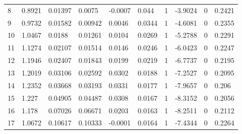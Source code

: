 \begin{singlespace}
\begin{table}[H]
\begin{tabular}{|l|l|l|l|l|l|l|l|l|l|}
8     & 0.8921  & 0.01397 & 0.0075  & -0.0007 & 0.044   & 1       & -3.9024 & 0      & 0.2421 \\
9     & 0.9732  & 0.01582 & 0.00942 & 0.0046  & 0.0344  & 1       & -4.6081 & 0      & 0.2355 \\
10    & 1.0467  & 0.0188  & 0.01261 & 0.0104  & 0.0269  & 1       & -5.2788 & 0      & 0.2291 \\
11    & 1.1274  & 0.02107 & 0.01514 & 0.0146  & 0.0246  & 1       & -6.0423 & 0      & 0.2247 \\
12    & 1.1946  & 0.02407 & 0.01843 & 0.0199  & 0.0219  & 1       & -6.7737 & 0      & 0.2195 \\
13    & 1.2019  & 0.03106 & 0.02592 & 0.0302  & 0.0188  & 1       & -7.2527 & 0      & 0.2095 \\
14    & 1.2352  & 0.03668 & 0.03193 & 0.0331  & 0.0177  & 1       & -7.9657 & 0      & 0.206  \\
15    & 1.227   & 0.04905 & 0.04487 & 0.0308  & 0.0167  & 1       & -8.3152 & 0      & 0.2056 \\
16    & 1.178   & 0.07026 & 0.06671 & 0.0203  & 0.0163  & 1       & -8.2511 & 0      & 0.2112 \\
17    & 1.0672  & 0.10617 & 0.10333 & -0.0001 & 0.0164  & 1       & -7.4344 & 0      & 0.2264
\end{tabular}
\end{table}


\end{singlespace}
